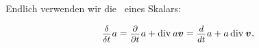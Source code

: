 \begin{tcolorbox}[breakable, enhanced, colback = orange!8, before upper={\parindent3.2ex}, parbox = false]
Endlich verwenden wir die~ eines Skalars:

\nopagebreak\vspace{-0.1em}\begin{equation*}
\scalebox{0.92}[0.92]{$\displaystyle\frac{\raisemath{-0.125em}{\delta}}{\delta t}$} \hspace{.15ex} a
= \scalebox{0.92}[0.92]{$\displaystyle\frac{\raisemath{-0.125em}{\partial}}{\partial t}$} \hspace{.15ex} a + \operatorname{div}\hspace{.1ex} a \bm{v}
= \scalebox{0.92}[0.92]{$\displaystyle\frac{\raisemath{-0.125em}{d}}{dt}$} \hspace{.15ex} a + a \operatorname{div}\hspace{.1ex} \bm{v}
\hspace{.1ex} .
\end{equation*}
\par
\end{tcolorbox}

